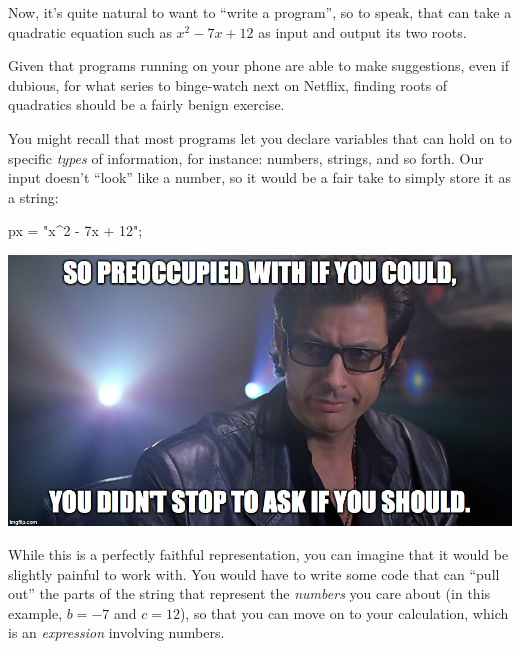 \documentclass[
  letterpaper,
  DIV=11,
  numbers=noendperiod]{scrreprt}
\newenvironment{Shaded}{\begin{snugshade}}{\end{snugshade}}
\newcommand{\NormalTok}[1]{\textcolor[rgb]{0.00,0.23,0.31}{#1}}
\newcommand{\OperatorTok}[1]{\textcolor[rgb]{0.37,0.37,0.37}{#1}}
\newcommand{\StringTok}[1]{\textcolor[rgb]{0.13,0.47,0.30}{#1}}
\begin{document}
Now, it's quite natural to want to ``write a program'', so to speak,
that can take a quadratic equation such as \(x^2 - 7x + 12\) as input
and output its two roots.

Given that programs running on your phone are able to make suggestions,
even if dubious, for what series to binge-watch next on Netflix, finding
roots of quadratics should be a fairly benign exercise.

You might recall that most programs let you declare variables that can
hold on to specific \emph{types} of information, for instance: numbers,
strings, and so forth. Our input doesn't ``look'' like a number, so it
would be a fair take to simply store it as a string:

\begin{Shaded}
\begin{Highlighting}[]
\NormalTok{px }\OperatorTok{=} \StringTok{"x\^{}2 {-} 7x + 12"}\OperatorTok{;}
\end{Highlighting}
\end{Shaded}

\begin{tcolorbox}[standard jigsaw,toptitle=1mm, titlerule=0mm, bottomtitle=1mm, title=\textcolor{quarto-callout-note-color}{\faInfo}\hspace{0.5em}{Now\ldots{}}, coltitle=black, colback=white, toprule=.15mm, colframe=quarto-callout-note-color-frame, arc=.35mm, rightrule=.15mm, opacityback=0, left=2mm, leftrule=.75mm, colbacktitle=quarto-callout-note-color!10!white, opacitybacktitle=0.6, bottomrule=.15mm]
\includegraphics{./figures/ch1-meme01.jpeg}
\end{tcolorbox}

While this is a perfectly faithful representation, you can imagine that
it would be slightly painful to work with. You would have to write some
code that can ``pull out'' the parts of the string that represent the
\emph{numbers} you care about (in this example, \(b = -7\) and
\(c = 12\)), so that you can move on to your calculation, which is an
\emph{expression} involving numbers.
\end{document}

